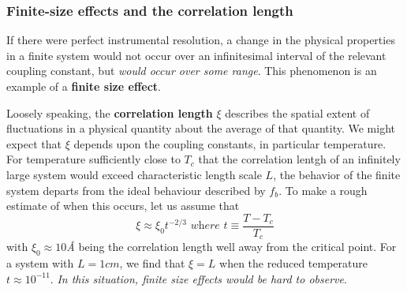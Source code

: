\documentclass[12pt,titlepage]{article}
\numberwithin{equation}{section}
\begin{document}
\subsubsection{Finite-size effects and the correlation length}
If there were perfect instrumental resolution, a change in the physical properties in a finite system would not occur over an infinitesimal interval of the relevant coupling constant, but \textit{would occur over some range}. This phenomenon is an example of a \textbf{finite size effect}.

Loosely speaking, the \textbf{correlation length} $\xi$ describes the spatial extent of fluctuations in a physical quantity about the average of that quantity. We might expect that $\xi$ depends upon the coupling constants, in particular temperature. For temperature sufficiently close to $T_c$ that the correlation lentgh of an infinitely large system would exceed characteristic length scale $L$, the behavior of the finite system departs from the ideal behaviour described by $f_b$. To make a rough estimate of when this occurs, let us assume that
\begin{equation}
    \xi\approx\xi_0t^{-2/3}\textit{ where }t\equiv\frac{T-T_c}{T_c}
\end{equation}
with $\xi_0\approx10$\textit{\r A} being the correlation length well away from the critical point. For a system with $L=1 cm$, we find that $\xi=L$ when the reduced temperature $t\approx10^{-11}$. \emph{In this situation, finite size effects would be hard to observe}.
\end{document}
